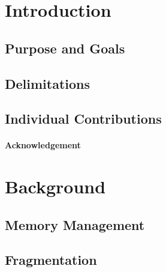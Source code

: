 \documentclass[a4paper,12pt]{article}
\begin{document}
\tableofcontents


\cleardoublepage

\mainmatter


\section{Introduction}
\label{sec:introduction}


\subsection{Purpose and Goals}
\label{sec:purpose}


\subsection{Delimitations}
\label{sec:delimitations}


\subsection{Individual Contributions}
\label{sec:individual_contrubitons}


\paragraph{Acknowledgement}


\section{Background}
\label{sec:background}


\subsection{Memory Management}
\label{sec:memory_management}


\subsection{Fragmentation}
\label{sec:fragmentation}

\end{document}
